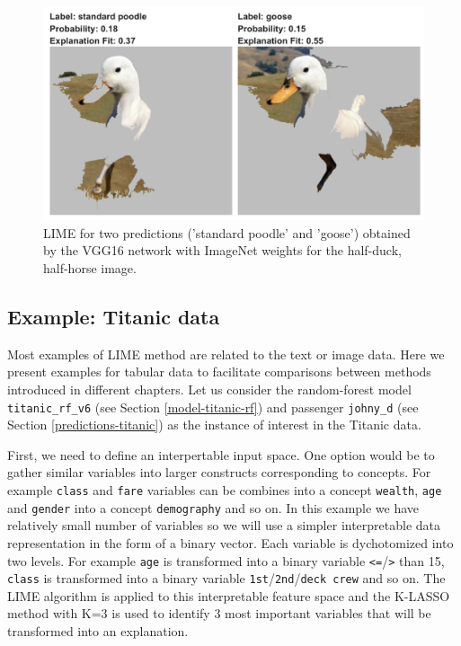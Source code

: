 \documentclass[12pt,]{krantz}
\begin{document}
\begin{figure}

{\centering \includegraphics[width=1\linewidth]{figure/duck_horse_04} 

}

\caption{LIME for two predictions ('standard poodle' and 'goose') obtained by the VGG16 network with ImageNet weights for the half-duck, half-horse image.}\label{fig:duckHorse04}
\end{figure}

\hypertarget{LIMEExample}{%
\subsection{Example: Titanic data}\label{LIMEExample}}

Most examples of LIME method are related to the text or image data. Here we present examples for tabular data to facilitate comparisons between methods introduced in different chapters.
Let us consider the random-forest model \texttt{titanic\_rf\_v6} (see Section \ref{model-titanic-rf}) and passenger \texttt{johny\_d} (see Section \ref{predictions-titanic}) as the instance of interest in the Titanic data.

First, we need to define an interpertable input space. One option would be to gather similar variables into larger constructs corresponding to concepts. For example \texttt{class} and \texttt{fare} variables can be combines into a concept \texttt{wealth}, \texttt{age} and \texttt{gender} into a concept \texttt{demography} and so on. In this example we have relatively small number of variables so we will use a simpler interpretable data representation in the form of a binary vector. Each variable is dychotomized into two levels. For example \texttt{age} is transformed into a binary variable \texttt{\textless{}=}/\texttt{\textgreater{}} than 15, \texttt{class} is transformed into a binary variable \texttt{1st}/\texttt{2nd}/\texttt{deck\ crew} and so on.
The LIME algorithm is applied to this interpretable feature space and the K-LASSO method with K=3 is used to identify 3 most important variables that will be transformed into an explanation.
\end{document}

